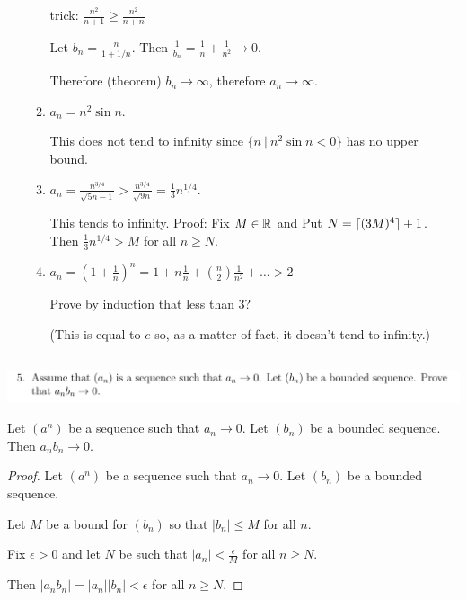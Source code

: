 \documentclass[12pt]{article}
\begin{document}
\begin{enumerate}[label=(\alph*)]
\begin{enumerate}[label=(\roman*)]
    trick:
    $\frac{n^2}{n + 1} \geq \frac{n^2}{n + n}$


    Let $b_n = \frac{n}{1 + 1/n}$. Then $\frac{1}{b_n} = \frac{1}{n} + \frac{1}{n^2} \to
    0$.

    Therefore (theorem) $b_n \to \infty$, therefore $a_n \to \infty$.

  \item $a_n = n^2\sin n$.

    This does not tend to infinity since $\{n ~|~ n^2\sin n < 0\}$ has no upper bound.
  \item $a_n = \frac{n^{3/4}}{\sqrt{5n - 1}} > \frac{n^{3/4}}{\sqrt{9n}} = \frac{1}{3}n^{1/4}$.

    This tends to infinity. Proof: Fix $M \in \mathbb{R}$ and Put $N = \lceil(3M)^4\rceil + 1$. Then
    $\frac{1}{3}n^{1/4} > M$ for all $n \geq N$.

  \item $a_n = (1 + \frac{1}{n})^n = 1 + n\frac{1}{n} + {n \choose 2}\frac{1}{n^2} + \ldots > 2$

    Prove by induction that less than 3?

    (This is equal to $e$ so, as a matter of fact, it doesn't tend to infinity.)

  \end{enumerate}
\end{enumerate}

\newpage
\subsection{}
\begin{mdframed}
  \includegraphics[width=400pt]{img/oxford-M2-analysis-I-3-5-1.png}
\end{mdframed}
\begin{claim*}
  Let $(a^n)$ be a sequence such that $a_n \to 0$. Let $(b_n)$ be a bounded sequence. Then
  $a_nb_n \to 0$.

\end{claim*}
\begin{proof}
  Let $(a^n)$ be a sequence such that $a_n \to 0$. Let $(b_n)$ be a bounded sequence.

  Let $M$ be a bound for $(b_n)$ so that $|b_n| \leq M$ for all $n$.

  Fix $\epsilon > 0$ and let $N$ be such that $|a_n| < \frac{\epsilon}{M}$ for all $n \geq N$.

  Then $|a_nb_n| = |a_n||b_n| < \epsilon$ for all $n \geq N$.
\end{proof}
\end{document}
